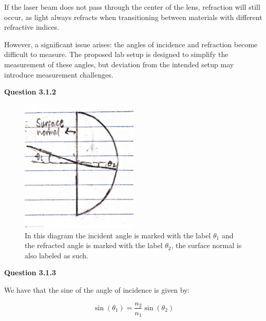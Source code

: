 \documentclass[a4paper,12pt]{article}
\begin{document}
If the laser beam does not pass through the center of the lens, refraction will still occur, as light always refracts when transitioning between materials with different refractive indices.

\vspace{0.1cm}

However, a significant issue arises: the angles of incidence and refraction become difficult to measure. The proposed lab setup is designed to simplify the measurement of these angles, but deviation from the intended setup may introduce measurement challenges.

\vspace{8cm}

\noindent \textbf{\LARGE Question 3.1.2}

\vspace{0.4cm}

\begin{figure}[htbp]
    \centering
    \includegraphics[width=0.5\textwidth]{first_diagram_lab1_PHY_192.jpg}
    \caption{In this diagram the incident angle is marked with the label $\theta_1$ and the refracted angle is marked with the label $\theta_2$, the surface normal is also labeled as such.} 
\end{figure}

\vspace{1cm}

\noindent \textbf{\LARGE Question 3.1.3}

\vspace{0.4cm}

We have that the sine of the angle of incidence is given by: 

\begin{equation}
    \sin(\theta_1) = \frac{n_2}{n_1} \sin(\theta_2)
\end{equation}
\end{document}
